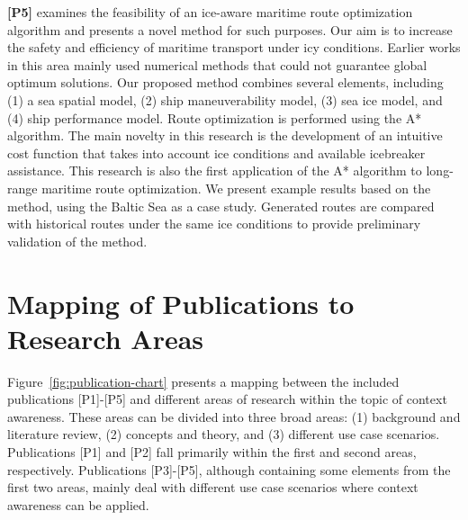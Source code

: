 \textbf{[P5]} examines the feasibility of an ice-aware maritime route optimization algorithm and presents a novel method for such purposes. Our aim is to increase the safety and efficiency of maritime transport under icy conditions. Earlier works in this area mainly used numerical methods that could not guarantee global optimum solutions. Our proposed method combines several elements, including (1) a sea spatial model, (2) ship maneuverability model, (3) sea ice model, and (4) ship performance model. Route optimization is performed using the A* algorithm. The main novelty in this research is the development of an intuitive cost function that takes into account ice conditions and available icebreaker assistance. This research is also the first application of the A* algorithm to long-range maritime route optimization. We present example results based on the method, using the Baltic Sea as a case study. Generated routes are compared with historical routes under the same ice conditions to provide preliminary validation of the method.

\section{Mapping of Publications to Research Areas}
\label{sec:relating_to_research}

Figure~\ref{fig:publication-chart} presents a mapping between the included publications [P1]-[P5] and different areas of research within the topic of context awareness. These areas can be divided into three broad areas: (1) background and literature review, (2) concepts and theory, and (3) different use case scenarios. Publications [P1] and [P2] fall primarily within the first and second areas, respectively. Publications [P3]-[P5], although containing some elements from the first two areas, mainly deal with different use case scenarios where context awareness can be applied.

